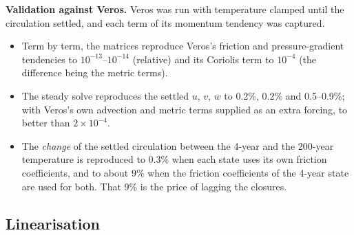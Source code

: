 \documentclass{article}
\begin{document}
\textbf{Validation against Veros.} Veros was run with temperature clamped until the circulation settled, and each term of its momentum tendency was captured.
\begin{itemize}
\item Term by term, the matrices reproduce Veros's friction and pressure-gradient tendencies to $10^{-13}$--$10^{-14}$ (relative) and its Coriolis term to $10^{-4}$ (the difference being the metric terms).
\item The steady solve reproduces the settled $u$, $v$, $w$ to 0.2\%, 0.2\% and 0.5--0.9\%; with Veros's own advection and metric terms supplied as an extra forcing, to better than $2\times10^{-4}$.
\item The \emph{change} of the settled circulation between the 4-year and the 200-year temperature is reproduced to 0.3\% when each state uses its own friction coefficients, and to about 9\% when the friction coefficients of the 4-year state are used for both. That 9\% is the price of lagging the closures.
\end{itemize}

\subsection{Linearisation}\label{sec:jacobian}
\end{document}
